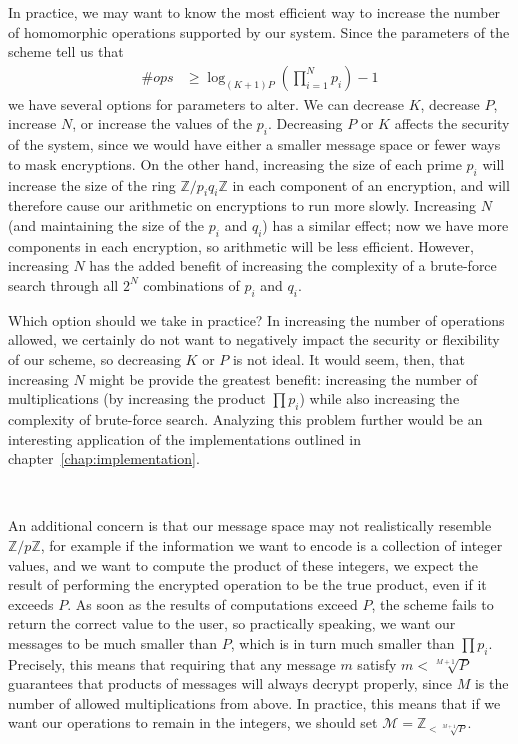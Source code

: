 \documentclass[11pt]{report}
\newcommand{\Z}{\mathbb{Z}}
\newcommand{\M}{\mathcal{M}}
\newcommand{\Zp}{\mathbb{Z}/p\mathbb{Z}}
\begin{document}
In practice, we may want to know the most efficient way to increase the number of homomorphic operations supported by our system. Since the parameters of the scheme tell us that
\begin{align*}
\#ops &\geq \log_{(K+1)P}\left(\prod_{i=1}^N p_i\right)-1
\end{align*}
we have several options for parameters to alter. We can decrease $K$, decrease $P$, increase $N$, or increase the values of the $p_i$. Decreasing $P$ or $K$ affects the security of the system, since we would have either a smaller message space or fewer ways to mask encryptions. On the other hand, increasing the size of each prime $p_i$ will increase the size of the ring $\Z/p_iq_i\Z$ in each component of an encryption, and will therefore cause our arithmetic on encryptions to run more slowly. Increasing $N$ (and maintaining the size of the $p_i$ and $q_i$) has a similar effect; now we have more components in each encryption, so arithmetic will be less efficient. However, increasing $N$ has the added benefit of increasing the complexity of a brute-force search through all $2^N$ combinations of $p_i$ and $q_i$.

Which option should we take in practice? In increasing the number of operations allowed, we certainly do not want to negatively impact the security or flexibility of our scheme, so decreasing $K$ or $P$ is not ideal. It would seem, then, that increasing $N$ might be provide the greatest benefit: increasing the number of multiplications (by increasing the product $\prod p_i$) while also increasing the complexity of brute-force search. Analyzing this problem further would be an interesting application of the implementations outlined in chapter~\ref{chap:implementation}.

\

An additional concern is that our message space may not realistically resemble $\Zp$, for example if the information we want to encode is a collection of integer values, and we want to compute the product of these integers, we expect the result of performing the encrypted operation to be the true product, even if it exceeds $P$. As soon as the results of computations exceed $P$, the scheme fails to return the correct value to the user, so practically speaking, we want our messages to be much smaller than $P$, which is in turn much smaller than $\prod p_i$. Precisely, this means that requiring that any message $m$ satisfy $m<\sqrt[M+1]{P}$ guarantees that products of messages will always decrypt properly, since $M$ is the number of allowed multiplications from above. In practice, this means that if we want our operations to remain in the integers, we should set $\M = \Z_{<\sqrt[M+1]{P}}$.
\end{document}
